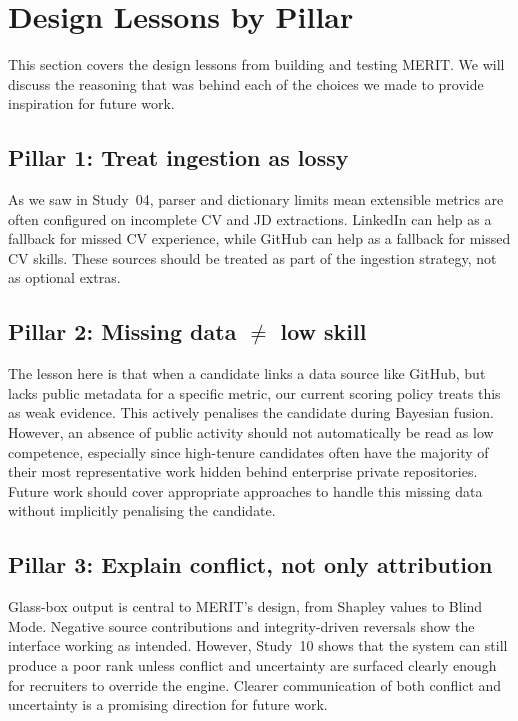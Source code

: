 \section{Design Lessons by Pillar}
\label{sec:pillar-lessons}

This section covers the design lessons from building and testing MERIT. We will discuss the reasoning that was behind each of the 
choices we made to provide inspiration for future work.

\subsection{Pillar 1: Treat ingestion as lossy}
\label{sec:pillar1-reflection}

As we saw in Study~04, parser and dictionary limits mean extensible metrics are often configured on incomplete CV and JD extractions.
LinkedIn can help as a fallback for missed CV experience, while GitHub can help as a fallback for missed CV skills. These sources should
be treated as part of the ingestion strategy, not as optional extras.

\subsection{Pillar 2: Missing data $\neq$ low skill}
\label{sec:pillar2-reflection}

The lesson here is that when a candidate links a data source like GitHub, but lacks public metadata for a specific metric, 
our current scoring policy treats this as weak evidence. This actively penalises the candidate during Bayesian fusion. 
However, an absence of public activity should not automatically be read as low competence, especially since high-tenure 
candidates often have the majority of their most representative work hidden behind enterprise private repositories. Future 
work should cover appropriate approaches to handle this missing data without implicitly penalising the candidate.

\subsection{Pillar 3: Explain conflict, not only attribution}
\label{sec:pillar3-reflection}

Glass-box output is central to MERIT's design, from Shapley values to Blind Mode. Negative source contributions and integrity-driven reversals
show the interface working as intended. However, Study~10 shows that the system can still produce a poor rank unless conflict and uncertainty
are surfaced clearly enough for recruiters to override the engine. Clearer communication of both conflict and uncertainty is a
promising direction for future work.
